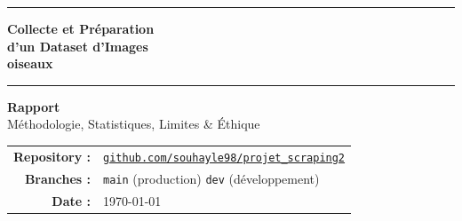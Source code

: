 \documentclass[12pt,a4paper]{article}
\begin{document}

\begin{titlepage}
  \begin{center}
    \vspace*{1.5cm}

    {\color{primary}\rule{\linewidth}{2pt}}
    \vspace{0.6cm}

    {\Huge\bfseries\color{primary}
      Collecte et Préparation\\[0.3em]
      d'un Dataset d'Images\\[0.3em]
     oiseaux }

    \vspace{0.4cm}
    {\color{primary}\rule{\linewidth}{2pt}}

    \vspace{1.2cm}

    \begin{tcolorbox}[colback=lightblue, colframe=primary, arc=6pt,
                      boxrule=1pt, width=0.85\linewidth]
      \centering
      {\large\bfseries Rapport}\\[0.4em]
      {\normalsize  Méthodologie, Statistiques, Limites \& Éthique}
    \end{tcolorbox}

    \vspace{2cm}

    \begin{tabular}{rl}
      \textbf{Repository :} &
        \href{https://github.com/souhayle98/projet_scraping2}
             {\color{secondary}\texttt{github.com/souhayle98/projet\_scraping2}} \\[0.4em]
      \textbf{Branches :}   & \texttt{main} (production) \quad \texttt{dev} (développement) \\[0.4em]
      \textbf{Date :}       & \today \\[0.4em]
    \end{tabular}

    \vfill


\end{center}
\end{titlepage}
\end{document}
